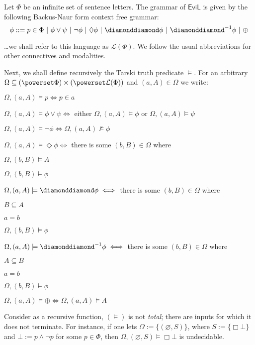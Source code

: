 \documentclass[11pt]{article}
\newcommand{\DD}{\diamonddiamond}
\newcommand{\Nec}{\Box}
\newcommand{\Pos}{\Diamond}
\begin{document}
Let $\Phi$ be an infinite set of sentence letters.  The grammar of $\mathsf{EviL}$ is given by the following Backus-Naur form context free grammar:
\[ \phi ::= p \in \Phi\ |\ \phi \vee \psi\ |\ \neg \phi\ |\ \Pos \phi \ | \ \DD \phi \ | \ \DD^{-1} \phi \ | \ \oplus \]

\ldots we shall refer to this language as $\mathcal{L}(\Phi)$.  We follow the usual abbreviations for other connectives and modalities.

Next, we shall define recursively the Tarski truth predicate $\models$.  For an arbitrary $\Omega \subseteq (\powerset \Phi) \times (\powerset \mathcal{L}(\Phi))$ and $(a,A) \in \Omega$ we write:
\begin{peano}
	\item $\Omega, (a,A) \models p \iff p \in a$
	\item $\Omega, (a,A) \models \phi \vee \psi \iff$ either $\Omega, (a,A) \models \phi$ or $\Omega, (a,A) \models \psi$
	\item $\Omega, (a,A) \models \neg \phi  \iff \Omega, (a,A) \not\models \phi$
	\item $\Omega, (a,A) \models \Pos \phi  \iff $ there is some $(b,B) \in \Omega$ where
		\begin{peano}
			\item $\Omega, (b,B) \models A$
			\item $\Omega, (b,B) \models \phi$
		\end{peano}
	\item $\Omega, (a,A) \models \DD \phi  \iff $ there is some $(b,B) \in \Omega$ where 
	\begin{peano}
		\item $B \subseteq A$
		\item $a = b$ 
		\item $\Omega, (b,B) \models \phi$
	\end{peano}
	\item $\Omega, (a,A) \models \DD^{-1} \phi  \iff $ there is some $(b,B) \in \Omega$ where
	\begin{peano}
		\item $A \subseteq B$
		\item $a = b$
		\item $\Omega, (b,B) \models \phi$
	\end{peano}
	\item $\Omega, (a,A) \models \oplus  \iff \Omega, (a,A) \models A$ 
\end{peano}

 Consider as a recursive function, $(\models)$ is not \emph{total}; there are inputs for which it does not terminate.  For instance, if one lets $\Omega := \{(\varnothing,S)\}$, where $S := \{ \Nec \bot \}$ and $\bot := p \wedge \neg p$ for some $p \in \Phi$, then $\Omega, (\varnothing,S) \models \Nec \bot$ is undecidable.
\end{document}
